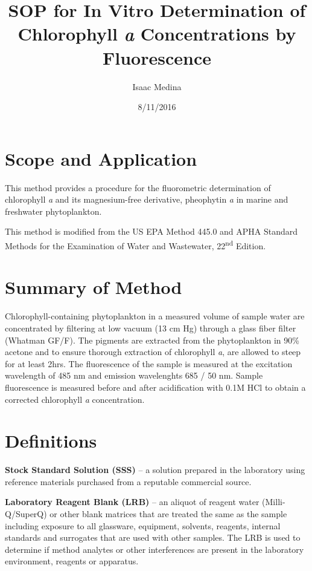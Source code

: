 \documentclass[12pt]{../SOP2}
\author{Isaac Medina}
\title{SOP for In Vitro Determination of Chlorophyll \textit{a} Concentrations by Fluorescence}
\date{8/11/2016}
\begin{document}


\maketitle

\section{Scope and Application}

\NP This method provides a procedure for the fluorometric determination of chlorophyll \textit{a} and its magnesium-free derivative, pheophytin \textit{a} in marine and freshwater phytoplankton.

\NP This method is modified from the US EPA Method 445.0 and APHA Standard Methods for the Examination of Water and Wastewater, 22\textsuperscript{nd} Edition. 


\section{Summary of Method}

\NP Chlorophyll-containing phytoplankton in a measured volume of sample water are concentrated by filtering at low vacuum (13 cm Hg) through a glass fiber filter (Whatman GF/F). The pigments are extracted from the phytoplankton in 90\% acetone and to ensure thorough extraction of chlorophyll \textit{a}, are allowed to steep for at least 2hrs. The fluorescence of the sample is measured at the excitation wavelength of 485 nm and emission wavelenghts 685 / 50 nm. Sample fluorescence is measured before and after acidification with 0.1M HCl to obtain a corrected chlorophyll \textit{a} concentration. 


\section{Definitions}
\NP \textbf{Stock Standard Solution (SSS)} -- a solution prepared in the laboratory using reference materials purchased from a reputable commercial source.

\NP \textbf{Laboratory Reagent Blank (LRB)} -- an aliquot of reagent water (Milli-Q/SuperQ) or other blank matrices that are treated the same as the sample including exposure to all glassware, equipment, solvents, reagents, internal standards and surrogates that are used with other samples. The LRB is used to determine if method analytes or other interferences are present in the laboratory environment, reagents or apparatus. 
\end{document}
